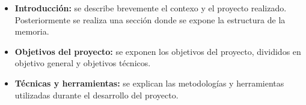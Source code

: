 \begin{itemize}
\item 
\textbf{Introducción:} se describe brevemente el contexo y el proyecto realizado. Posteriormente se realiza una sección donde se expone la estructura de la memoria.

\item 
\textbf{Objetivos del proyecto:} se exponen los objetivos del proyecto, divididos en objetivo general y objetivos técnicos.


\item
\textbf{Técnicas y herramientas:} se explican las metodologías y herramientas utilizadas durante el desarrollo del proyecto.
\end{itemize}